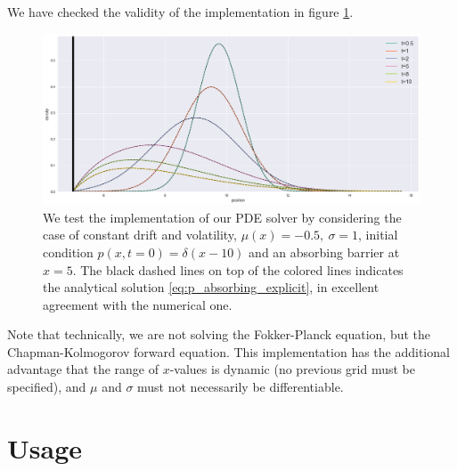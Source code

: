 \documentclass[11pt]{article}
\begin{document}
We have checked the validity of the implementation in figure \ref{fig:PDE_solution}. 
\begin{figure}[!htb]
	\centering
	\includegraphics[width=\textwidth]{PDE_solution.png}
	\caption{We test the implementation of our PDE solver by considering the case of constant drift and volatility, $\mu(x) =  -0.5, ~\sigma = 1$, 
			initial condition $p(x, t=0) = \delta(x-10)$ and an absorbing barrier at $x=5$. 
			The black dashed lines on top of the colored lines indicates the analytical solution \eqref{eq:p_absorbing_explicit},
			in excellent agreement with the numerical one.}
	\label{fig:PDE_solution}
\end{figure}
Note that technically, we are not solving the Fokker-Planck equation, but the Chapman-Kolmogorov forward equation. 
This implementation has the additional advantage that the range of $x$-values is dynamic (no previous grid must be specified), 
and $\mu$ and $\sigma$ must not necessarily be differentiable. 



\section{Usage} 
\end{document}
